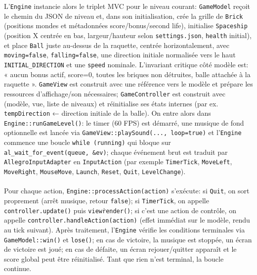 \documentclass[12pt]{article}
\begin{document}
L’\colorbox{gray!20}{\texttt{Engine}} instancie alors le triplet MVC pour le niveau courant: \colorbox{gray!20}{\texttt{GameModel}} reçoit le chemin du JSON de niveau et, dans son initialisation, crée la grille de \colorbox{gray!20}{\texttt{Brick}} (positions mondes et métadonnées score/bonus/second life), initialise \colorbox{gray!20}{\texttt{Spaceship}} (position X centrée en bas, largeur/hauteur selon \colorbox{gray!20}{\texttt{settings.json}}, \texttt{health} initial), et place \colorbox{gray!20}{\texttt{Ball}} juste au-dessus de la raquette, centrée horizontalement, avec \texttt{moving=false}, \texttt{falling=false}, une direction initiale normalisée vers le haut \texttt{INITIAL\_DIRECTION} et une \texttt{speed} nominale. L’invariant critique côté modèle est: « aucun bonus actif, score=0, toutes les briques non détruites, balle attachée à la raquette ». \colorbox{gray!20}{\texttt{GameView}} est construit avec une référence vers le modèle et prépare les ressources d’affichage/son nécessaires; \colorbox{gray!20}{\texttt{GameController}} est construit avec (modèle, vue, liste de niveaux) et réinitialise ses états internes (par ex. \texttt{tempDirection} ← direction initiale de la balle). On entre alors dans \colorbox{gray!20}{\texttt{Engine::runGameLevel()}}: le timer (60 FPS) est démarré, une musique de fond optionnelle est lancée via \colorbox{gray!20}{\texttt{GameView::playSound(..., loop=true)}} et l’\colorbox{gray!20}{\texttt{Engine}} commence une boucle \texttt{while (running)} qui bloque sur \texttt{al\_wait\_for\_event(queue, \&ev)}; chaque événement brut est traduit par \colorbox{gray!20}{\texttt{AllegroInputAdapter}} en \colorbox{gray!20}{\texttt{InputAction}} (par exemple \texttt{TimerTick}, \texttt{MoveLeft}, \texttt{MoveRight}, \texttt{MouseMove}, \texttt{Launch}, \texttt{Reset}, \texttt{Quit}, \texttt{LevelChange}). 

\paragraph{}

Pour chaque action, \colorbox{gray!20}{\texttt{Engine::processAction(action)}} s’exécute: si \texttt{Quit}, on sort proprement (arrêt musique, retour \texttt{false}); si \texttt{TimerTick}, on appelle \colorbox{gray!20}{\texttt{controller.update()}} puis \colorbox{gray!20}{\texttt{view\.render()}}; si c’est une action de contrôle, on appelle \colorbox{gray!20}{\texttt{controller.handleAction(action)}} (effet immédiat sur le modèle, rendu au tick suivant). Après traitement, l’\colorbox{gray!20}{\texttt{Engine}} vérifie les conditions terminales via \colorbox{gray!20}{\texttt{GameModel::win()}} et \colorbox{gray!20}{\texttt{lose()}}; en cas de victoire, la musique est stoppée, un écran de victoire est joué; en cas de défaite, un écran rejouer/quitter apparaît et le score global peut être réinitialisé. Tant que rien n’est terminal, la boucle continue.
\end{document}
